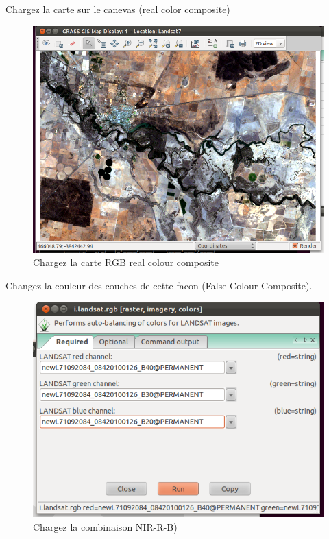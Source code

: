 Chargez la carte sur le canevas (real color composite)

\begin{figure}[htbp]
   \centering
   \includegraphics[scale=0.35]{grass_rs005.png}
   \caption{Chargez la carte RGB real colour composite}
   \label{fig:grass_rs005}
\end{figure}

Changez la couleur des couches de cette facon (False Colour Composite).

\begin{figure}[htbp]
   \centering
   \includegraphics[scale=0.45]{grass_rs006.png}
   \caption{Chargez la combinaison NIR-R-B)}
   \label{fig:grass_rs006}
\end{figure}

